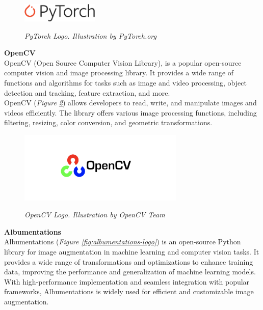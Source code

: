 \begin{figure}[H]
\centering
\includegraphics[width=0.325\textwidth]{imatges/studies_and_decisions/pytorch-logo.png}
\caption[PyTorch Logo]{\textit{PyTorch Logo. Illustration by PyTorch.org}}
{\label{fig:pytorch-logo}}
\end{figure}

\vspace{0.5cm}
\textbf{OpenCV} \\

OpenCV (Open Source Computer Vision Library), is a popular open-source computer vision and image processing library. It provides a wide range of functions and algorithms for tasks such as image and video processing, object detection and tracking, feature extraction, and more. \\

OpenCV (\textit{Figure \ref{fig:opencv-logo}}) allows developers to read, write, and manipulate images and videos efficiently. The library offers various image processing functions, including filtering, resizing, color conversion, and geometric transformations. 

\begin{figure}[H]
\centering
\begin{adjustbox}{trim=1cm 1cm 1cm 1cm, clip}
\includegraphics[width=0.7\textwidth]{imatges/studies_and_decisions/OpenCV-logo.png}
\end{adjustbox}
\caption[OpenCV Logo]{\textit{OpenCV Logo. Illustration by OpenCV Team}}
{\label{fig:opencv-logo}}
\end{figure}


\vspace{0.5cm}
\textbf{Albumentations} \\

Albumentations (\textit{Figure \ref{fig:albumentations-logo}}) is an open-source Python library for image augmentation in machine learning and computer vision tasks. It provides a wide range of transformations and optimizations to enhance training data, improving the performance and generalization of machine learning models. With high-performance implementation and seamless integration with popular frameworks, Albumentations is widely used for efficient and customizable image augmentation.

